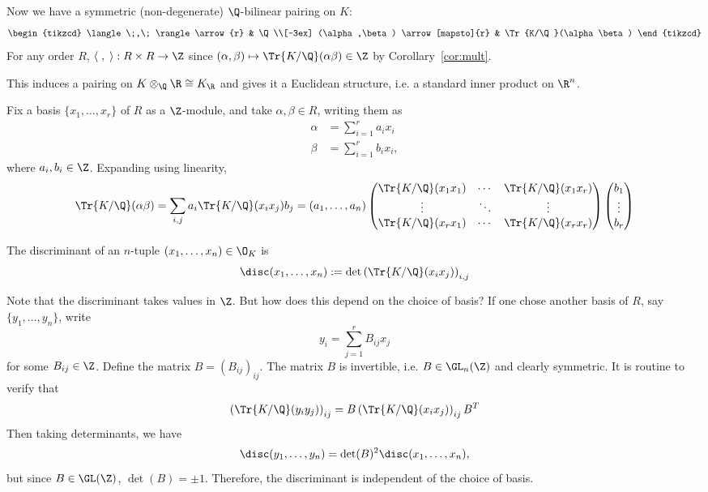 Now we have a symmetric (non-degenerate) $\Q$-bilinear pairing on $K$:
	\[
	\begin{tikzcd}
	\langle \;,\; \rangle \arrow{r} & \Q \\[-3ex]
	(\alpha,\beta) \arrow[mapsto]{r} & \Tr{K/\Q}(\alpha\beta)
	\end{tikzcd}
	\]
For any order $R$, $\langle \;,\;\rangle: R \times R \to \Z$ since $(\alpha,\beta) \mapsto \Tr{K/\Q}(\alpha\beta) \in \Z$ by Corollary~\ref{cor:mult}. 

\begin{rem}
This induces a pairing on $K \otimes_\Q \R \cong K_\R$ and gives it a Euclidean structure, i.e. a standard inner product on $\R^n$.
\end{rem}

Fix a basis $\{x_1,\ldots,x_r\}$ of $R$ as a $\Z$-module, and take $\alpha,\beta \in R$, writing them as
	\[
	\begin{split}
	\alpha&= \sum_{i=1}^r a_i x_i \\
	\beta&= \sum_{i=1}^r b_i x_i,
	\end{split}
	\]
where $a_i,b_i \in \Z$. Expanding using linearity, 
	\[
	\Tr{K/\Q}(\alpha\beta)= \sum_{i,j} a_i \Tr{K/\Q}(x_ix_j)b_j= (a_1,\ldots,a_n) 
	\begin{pmatrix}
	\Tr{K/\Q}(x_1x_1) & \cdots & \Tr{K/\Q}(x_1x_r) \\
	\vdots & \ddots & \vdots \\
	\Tr{K/\Q}(x_rx_1) & \cdots & \Tr{K/\Q}(x_rx_r)
	\end{pmatrix}
	\begin{pmatrix}
	b_1 \\ \vdots \\ b_r
	\end{pmatrix}
	\]

\begin{dfn}[Discriminant]
The discriminant of an $n$-tuple $(x_1,\ldots,x_n) \in \O_K$ is
	\[
	\disc(x_1,\ldots,x_n):= \det\left(\Tr{K/\Q}(x_ix_j)\right)_{i,j}
	\]
\end{dfn}

Note that the discriminant takes values in $\Z$. But how does this depend on the choice of basis? If one chose another basis of $R$, say $\{y_1,\ldots,y_n\}$, write
	\[
	y_i = \sum_{j=1}^r B_{ij} x_j
	\]
for some $B_{ij} \in \Z$. Define the matrix $B=(B_{ij})_{ij}$. The matrix $B$ is invertible, i.e. $B \in \GL_n(\Z)$ and clearly symmetric. It is routine to verify that
	\[
	\left( \Tr{K/\Q}(y_iy_j) \right)_{ij}= B \left(\Tr{K/\Q}(x_ix_j) \right)_{ij} B^T
	\]
Then taking determinants, we have
	\[
	\disc(y_1,\ldots,y_n)= \det(B)^2 \disc(x_1,\ldots,x_n),
	\]
but since $B \in \GL(\Z)$, $\det(B)=\pm 1$. Therefore, the discriminant is independent of the choice of basis. 

